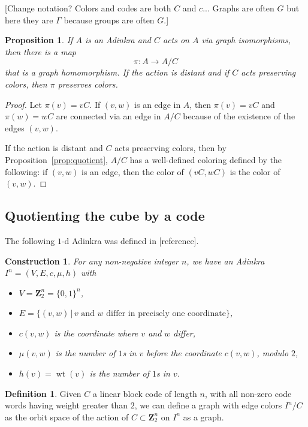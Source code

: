 \documentclass[12pt,twoside,singlespace]{article}
\numberwithin{equation}{section}
\newtheorem{prop}[equation]{Proposition}
\newtheorem{construction}[equation]{Construction}
\theoremstyle{definition}
\newtheorem{definition}[equation]{Definition}
\newcommand{\ZZ}{\mathbf{Z}}
\newcommand{\on}{\operatorname}
\newcommand{\wt}{\on{wt}}
\begin{document}
[Change notation?  Colors and codes are both $C$ and $c$...  Graphs are often $G$ but here they are $\Gamma$ because groups are often $G$.]

\begin{prop}
If $A$ is an Adinkra and $C$ acts on $A$ via graph isomorphisms, then there is a map
\[\pi:A\to A/C\]
 that is a graph homomorphism.  If the action is distant and if $C$ acts preserving colors, then $\pi$ preserves colors.
\end{prop}
\begin{proof}
Let $\pi(v)=vC$.  If $(v,w)$ is an edge in $A$, then $\pi(v)=vC$ and $\pi(w)=wC$ are connected via an edge in $A/C$ because of the existence of the edges $(v,w)$.

If the action is distant and $C$ acts preserving colors, then by Proposition~\ref{prop:quotient}, $A/C$ has a well-defined coloring defined by the following: if $(v,w)$ is an edge, then the color of $(vC,wC)$ is the color of $(v,w)$.
\end{proof}

\subsection{Quotienting the cube by a code}



The following $1$-d Adinkra was defined in [reference].
\begin{construction}
For any non-negative integer $n$, we have an Adinkra $I^n=(V,E,c,\mu,h)$ with
\begin{itemize}
\item $V=\ZZ_2^n=\{0,1\}^n$,
\item $E=\{(v,w)\,|\,\mbox{$v$ and $w$ differ in precisely one coordinate}\}$,
\item $c(v,w)$ is the coordinate where $v$ and $w$ differ,
\item $\mu(v,w)$ is the number of $1$s in $v$ before the coordinate $c(v,w)$, modulo $2$,
\item $h(v)=\wt(v)$ is the number of $1$s in $v$.
\end{itemize}
\end{construction}


\begin{definition}
Given $C$ a linear block code of length $n$, with all non-zero code words having weight greater than $2$, we can define a graph with edge colors $I^n/C$ as the orbit space of the action of $C\subset \ZZ_2^n$ on $I^n$ as a graph.
\end{definition}
\end{document}
